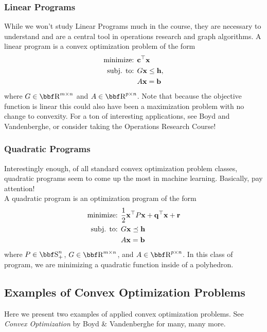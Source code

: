 \documentclass{article}
\begin{document}
\subsubsection{Linear Programs}

While we won't study Linear Programs much in the course, they
are necessary to understand and are a central tool in operations
research and graph algorithms. A linear program is a convex
optimization problem of the form
\begin{align*}
    \text{minimize: } & {\bf c}^\top{\bf x}\\
    \text{subj. to: } & G{\bf x} \leq {\bf h},\\
                      & A{\bf x} = {\bf b}
\end{align*}
where $G\in\RR^{m\times n}$ and $A\in\RR^{p\times n}$. Note that
because the objective function is linear this could also have been
a maximization problem with no change to convexity. For a ton
of interesting applications, see Boyd and Vandenberghe, or consider
taking the Operations Research Course!

\subsubsection{Quadratic Programs}

Interestingly enough, of all standard convex optimization problem classes,
quadratic programs seem to come up the most in machine learning. Basically,
pay attention!\\

A quadratic program is an optimization program of the form
\begin{align*}
    \text{minimize: } & \frac{1}{2}{\bf x}^\top P{\bf x} + {\bf q}^\top{\bf x} + {\bf r}\\
    \text{subj. to: } & G{\bf x} \preceq{\bf h}\\
                      & A{\bf x} = {\bf b}
\end{align*}
where $P\in\SS_+^n$, $G\in\RR^{m\times n}$, and $A\in\RR^{p\times n}$.
In this class of program, we are minimizing a quadratic function inside
of a polyhedron.

\subsection{Examples of Convex Optimization Problems}

Here we present two examples of applied convex optimization
problems. See \textit{Convex Optimization} by Boyd \&
Vandenberghe for many, many more.
\end{document}
